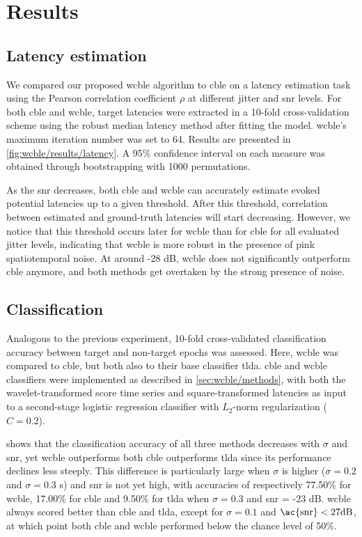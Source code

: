\section{Results}
\label{sec:wcble/results}

\subsection{Latency estimation}
We compared our proposed \ac{wcble} algorithm to \ac{cble} on a latency
estimation task using the Pearson correlation coefficient $\rho$ at different
jitter and \ac{snr} levels.
For both \ac{cble} and \ac{wcble}, target latencies were extracted in a
10-fold cross-validation scheme using the robust median latency method after
fitting the model.
\Ac{wcble}'s maximum iteration number was set to 64.
Results are presented in \cref{fig:wcble/results/latency}.
A 95\% confidence interval on each measure was obtained through bootstrapping
with 1000 permutations.

As the \ac{snr} decreases, both \ac{cble} and \ac{wcble} can accurately
estimate evoked potential latencies up to a given threshold. After this
threshold, correlation between estimated and ground-truth latencies will start
decreasing.
However, we notice that this threshold occurs later for \ac{wcble} than for
\ac{cble} for all evaluated jitter levels, indicating that \ac{wcble} is more
robust in the presence of pink spatiotemporal noise.
At around -28 dB, \ac{wcble} does not significantly outperform \ac{cble}
anymore, and both methods get overtaken by the strong presence of noise.

\subsection{Classification}

Analogous to the previous experiment, 10-fold cross-validated classification
accuracy between target and non-target epochs was assessed.
Here, \ac{wcble} was compared to \ac{cble}, but both also to their base classifier
\ac{tlda}.
\Ac{cble} and \ac{wcble} classifiers were implemented as described
in \cref{sec:wcble/methods}, with both the wavelet-transformed score time series
and square-transformed latencies as input to a second-stage logistic regression
classifier with $L_2$-norm regularization ($C=0.2$).


 shows that the classification accuracy of all
three methods decreases with $\sigma$ and \ac{snr}, yet \ac{wcble} outperforms
both \ac{cble} outperforms \ac{tlda} since its performance declines less steeply.
This difference is particularly large when $\sigma$ is higher
($\sigma=0.2$ and $\sigma=0.3$ s) and \ac{snr} is not yet high, with accuracies of respectively
77.50\% for \ac{wcble}, 17.00\% for \ac{cble} and 9.50\% for \ac{tlda} when
$\sigma=0.3$ and \ac{snr} = -23 dB.
\Ac{wcble} always scored better than \ac{cble} and \ac{tlda}, except for
$\sigma=0.1$ and $\text{\ac{snr}} < 27 \text{dB}$, at which point both \ac{cble}
and \ac{wcble} performed below the chance level of 50\%.


